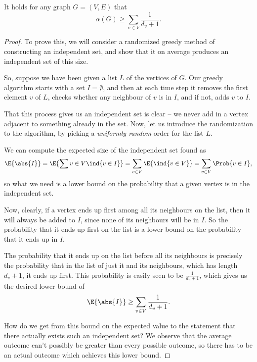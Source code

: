 \documentclass[nobib]{tufte-handout}
\begin{document}
\begin{theorem}
    It holds for any graph $G = (V,E)$ that
    $$\alpha(G) \geq \sum_{v \in V} \frac{1}{d_v + 1}.$$

    \begin{proof}
        To prove this, we will consider a randomized greedy method of constructing an independent set, and show that it on average produces an independent set of this size.

        So, suppose we have been given a list $L$ of the vertices of $G$. Our greedy algorithm starts with a set $I = \emptyset$, and then at each time step it removes the first element $v$ of $L$, checks whether any neighbour of $v$ is in $I$, and if not, adds $v$ to $I$.
        
        That this process gives us an independent set is clear -- we never add in a vertex adjacent to something already in the set. Now, let us introduce the randomization to the algorithm, by picking a \emph{uniformly random} order for the list $L$.

        We can compute the expected size of the independent set found as
        $$\E{\abs{I}} = \E{\sum{v\in V} \ind{v \in I}} = \sum_{v \in V} \E{\ind{v \in V}} = \sum_{v\in V}\Prob{v \in I},$$
        so what we need is a lower bound on the probability that a given vertex is in the independent set.

        Now, clearly, if a vertex ends up first among all its neighbours on the list, then it will always be added to $I$, since none of its neighbours will be in $I$. So the probability that it ends up first on the list is a lower bound on the probability that it ends up in $I$.

        The probability that it ends up on the list before all its neighbours is precisely the probability that in the list of just it and its neighbours, which has length $d_v + 1$, it ends up first. This probability is easily seen to be $\frac{1}{d_v + 1}$, which gives us the desired lower bound of
        $$\E{\abs{I}} \geq \sum_{v\in V} \frac{1}{d_v + 1}.$$

        How do we get from this bound on the expected value to the statement that there actually exists such an independent set? We observe that the average outcome can't possibly be greater than every possible outcome, so there has to be an actual outcome which achieves this lower bound.
    \end{proof}
\end{theorem}
\end{document}
